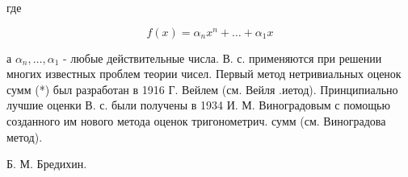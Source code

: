 \documentclass[10pt]{article}
\begin{document}
где



\[

f(x)=\alpha_{n} x^{n}+\ldots+\alpha_{1} x

\]



а $\alpha_{n}, \ldots, \alpha_{1}$ - любые действительные числа. В. с. применяются при решении многих известных проблем теории чисел. Первый метод нетривиальных оценок сумм (*) был разработан в 1916 Г. Вейлем (см. Вейля .иетод). Принципиально лучшие оценки В. с. были получены в 1934 И. М. Виноградовым с помощью созданного им нового метода оценок тригонометрич. сумм (см. Виноградова метод).



Б. М. Бредихин.
\end{document}
